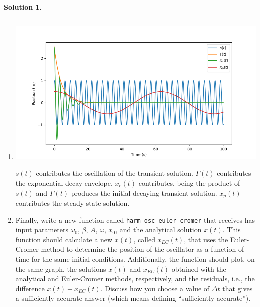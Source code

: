 \documentclass[10pt]{article}
\theoremstyle{definition}
\newtheorem{soln}{Solution}
\begin{document}
\begin{soln}
\begin{enumerate}[label=(\alph*)]
            \item \inputminted[breaklines, autogobble]{python3}{./python/q1/q1f.py}
                  \begin{center}
                        \includegraphics[scale=0.75]{Figure_3.png}
                  \end{center}
                  $s(t)$ contributes the oscillation of the transient solution. $\Gamma(t)$ contributes the exponential decay envelope. $x_c(t)$ contributes,
                  being the product of $s(t)$ and $\Gamma(t)$ produces the initial decaying transient solution. $x_p(t)$ contributes the steady-state solution.

            \item Finally, write a new function called \verb|harm_osc_euler_cromer| that receives has input parameters $\omega_0$, $\beta$,
                  $A$, $\omega$, $x_0$, and the analytical solution $x(t)$. This function should calculate a new $x(t)$, called $x_{EC}(t)$, that uses
                  the Euler-Cromer method to determine the position of the oscillator as a function of time for the same initial conditions. Additionally, the function should
                  plot, on the same graph, the solutions $x(t)$ and $x_{EC}(t)$ obtained with the analytical and Euler-Cromer methods, respectively, and the residuals, i.e.,
                  the difference $x(t)-x_{EC}(t)$. Discuss how you choose a value of $\Delta t$ that gives a sufficiently accurate answer (which means defining
                  ``sufficiently accurate'').
      \end{enumerate}
\end{soln}
\end{document}
